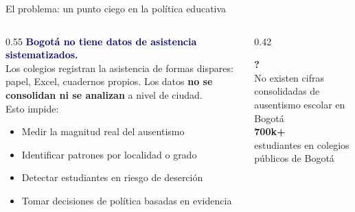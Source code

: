 \documentclass[aspectratio=169, 12pt]{beamer}
\begin{document}
\begin{frame}{El problema: un punto ciego en la política educativa}
\vspace{0.2cm}
\begin{columns}[T]
  \begin{column}{0.55\textwidth}
    \textbf{\textcolor{navy}{Bogotá no tiene datos de asistencia sistematizados.}}\\[8pt]
    Los colegios registran la asistencia de formas dispares:
    papel, Excel, cuadernos propios. Los datos \textbf{no se consolidan
    ni se analizan} a nivel de ciudad.\\[12pt]
    Esto impide:
    \begin{itemize}\setlength\itemsep{4pt}
      \item Medir la magnitud real del ausentismo
      \item Identificar patrones por localidad o grado
      \item Detectar estudiantes en riesgo de deserción
      \item Tomar decisiones de política basadas en evidencia
    \end{itemize}
  \end{column}
  \begin{column}{0.42\textwidth}
    \begin{tcolorbox}[colback=rojo!8, colframe=rojo, arc=10pt,
      boxrule=1.5pt, title={\color{white}\bfseries Magnitud del problema},
      coltitle=white, colbacktitle=rojo]
      \centering
      {\color{rojo}\fontsize{28}{32}\selectfont\bfseries ?}\\[4pt]
      {\small\color{textgray} No existen cifras consolidadas de ausentismo escolar en Bogotá}\\[8pt]
      {\color{rojo}\fontsize{20}{24}\selectfont\bfseries 700k+}\\[4pt]
      {\small\color{textgray} estudiantes en colegios públicos de Bogotá}
    \end{tcolorbox}
  \end{column}
\end{columns}
\end{frame}
\end{document}
